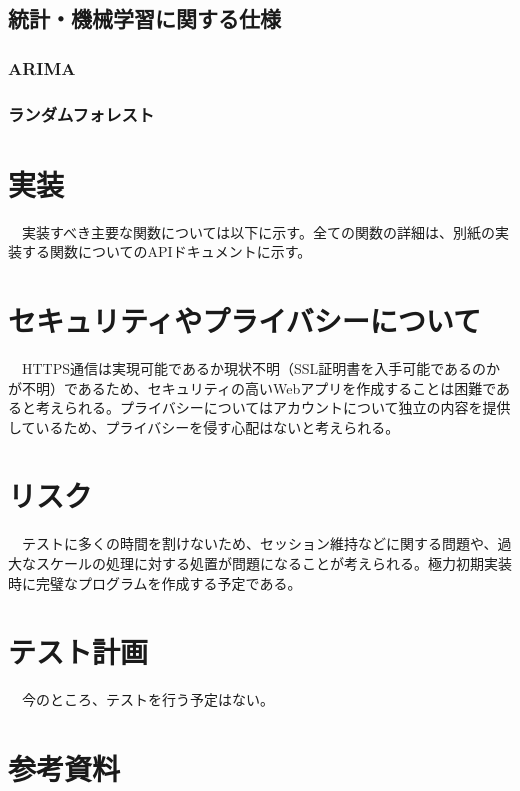 \documentclass{scrartcl}
\begin{document}
\subsection{統計・機械学習に関する仕様}
\label{sec:org0fa9867}

\subsubsection{ARIMA}
\label{sec:orgf7dc3bc}

\subsubsection{ランダムフォレスト}
\label{sec:org64e8d4c}

\section{実装}
\label{sec:orgb7a425d}
　実装すべき主要な関数については以下に示す。全ての関数の詳細は、別紙の実装する関数についてのAPIドキュメントに示す。\\

\section{セキュリティやプライバシーについて}
\label{sec:org26e42cc}
　HTTPS通信は実現可能であるか現状不明（SSL証明書を入手可能であるのかが不明）であるため、セキュリティの高いWebアプリを作成することは困難であると考えられる。プライバシーについてはアカウントについて独立の内容を提供しているため、プライバシーを侵す心配はないと考えられる。\\

\section{リスク}
\label{sec:org71231d6}
　テストに多くの時間を割けないため、セッション維持などに関する問題や、過大なスケールの処理に対する処置が問題になることが考えられる。極力初期実装時に完璧なプログラムを作成する予定である。\\
\section{テスト計画}
\label{sec:org1f770f6}
　今のところ、テストを行う予定はない。\\

\section{参考資料}
\label{sec:org854eb4d}
\end{document}
